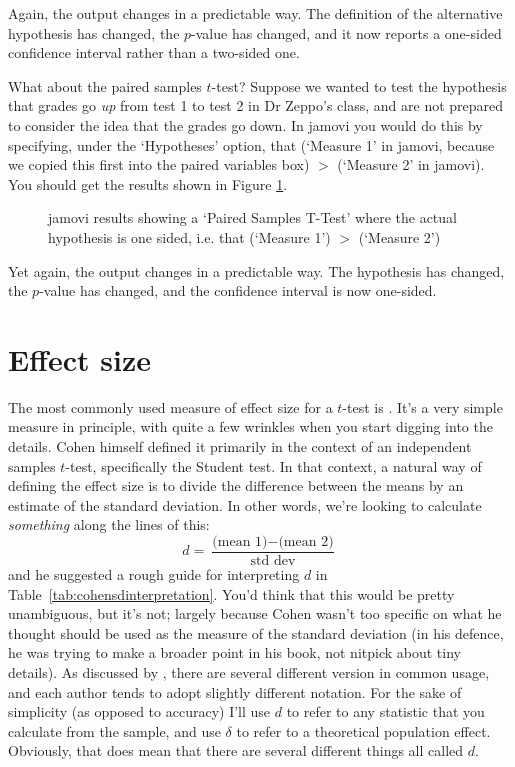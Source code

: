Again, the output changes in a predictable way. The definition of the alternative hypothesis has changed, the $p$-value has changed, and it now reports a one-sided confidence interval rather than a two-sided one.

What about the paired samples $t$-test? Suppose we wanted to test the hypothesis that grades go {\it up} from test 1 to test 2 in Dr Zeppo's class, and are not prepared to consider the idea that the grades go down. In jamovi you would do this by specifying, under the `Hypotheses' option, that  (`Measure 1' in jamovi, because we copied this first into the paired variables box) $>$  (`Measure 2' in jamovi). You should get the results shown in Figure \ref{fig:ttest_onesided3}.

\begin{figure}[h]
\begin{center}
\caption{jamovi results showing a `Paired Samples T-Test' where the actual hypothesis is one sided, i.e. that  (`Measure 1') $>$  (`Measure 2')}
\label{fig:ttest_onesided3}
\end{center}
\end{figure}

Yet again, the output changes in a predictable way. The hypothesis has changed, the $p$-value has changed, and the confidence interval is now one-sided. 



\section{Effect size~\label{sec:cohensd}}

The most commonly used measure of effect size for a $t$-test is  \cite{Cohen1988}. It's a very simple measure in principle, with quite a few wrinkles when you start digging into the details. Cohen himself defined it primarily in the context of an independent samples $t$-test, specifically the Student test. In that context, a natural way of defining the effect size is to divide the difference between the means by an estimate of the standard deviation. In other words, we're looking to calculate {\it something} along the lines of this:
$$
d = \frac{\mbox{(mean 1)} - \mbox{(mean 2)}}{\mbox{std dev}}
$$
and he suggested a rough guide for interpreting $d$ in Table~\ref{tab:cohensdinterpretation}. You'd think that this would be pretty unambiguous, but it's not; largely because Cohen wasn't too specific on what he thought should be used as the measure of the standard deviation (in his defence, he was trying to make a broader point in his book, not nitpick about tiny details). As discussed by , there are several different version in common usage, and each author tends to adopt slightly different notation. For the sake of simplicity (as opposed to accuracy) I'll use $d$ to refer to any statistic that you calculate from the sample, and  use $\delta$ to refer to a theoretical population effect. Obviously, that does mean that there are several different things all called $d$. 

